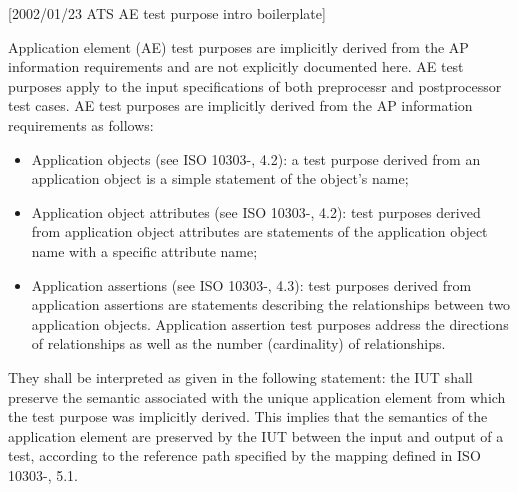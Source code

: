 [2002/01/23 ATS AE test purpose intro boilerplate]

    Application element (AE) test purposes are implicitly derived
from the AP information requirements and are not explicitly documented
here. AE test purposes apply to the input specifications of both
preprocessr and postprocessor test cases. AE test purposes are implicitly
derived from the AP information requirements as follows:
\begin{itemize}
\item Application objects (see ISO 10303-\theAPpartno, 4.2):
  a test purpose derived from an application object is a simple
  statement of the object's name;

\item Application object attributes (see ISO 10303-\theAPpartno, 4.2):
  test purposes derived from application object attributes are
  statements of the application object name with a specific attribute name;

\item Application assertions (see ISO 10303-\theAPpartno, 4.3):
  test purposes derived from application assertions are
  statements describing the relationships between two application objects.
  Application assertion test purposes address the directions of
  relationships as well as the number (cardinality) of relationships.

\end{itemize}

They shall be interpreted as given in the
following statement:
    the IUT shall preserve the semantic associated with the unique
application element from which the test purpose was implicitly derived.
This implies that the semantics of the application element are
preserved by the IUT between the input and output of a test,
according to the reference path specified by the mapping
\maptableorspec{}
defined in ISO 10303-\theAPpartno, 5.1.
\par

\endinput
